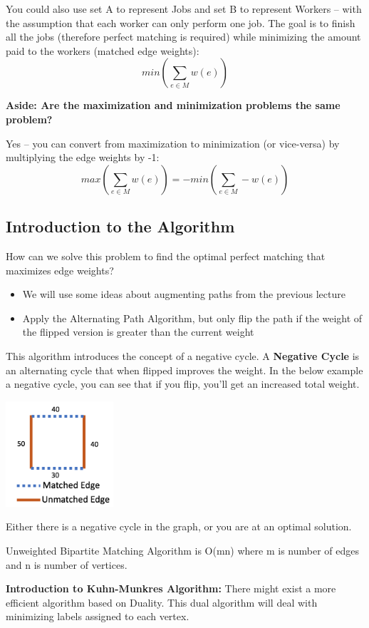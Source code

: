 \documentclass[a4paper]{article}
\begin{document}
You could also use set A to represent Jobs and set B to represent Workers – with the assumption that each worker can only perform one job. The goal is to finish all the jobs (therefore perfect matching is required) while minimizing the amount paid to the workers (matched edge weights):
	\[min(\sum_{e\in M} w(e))\]

\textbf{Aside: Are the maximization and minimization problems the same problem?}

Yes -- you can convert from maximization to minimization (or vice-versa) by multiplying the edge weights by -1:
	\[max(\sum_{e\in M} w(e)) = -min(\sum_{e\in M} -w(e))\]

\subsection{Introduction to the Algorithm}
How can we solve this problem to find the optimal perfect matching that maximizes edge weights?
\begin{itemize}
\item We will use some ideas about augmenting paths from the previous lecture
\item Apply the Alternating Path Algorithm, but only flip the path if the weight of the flipped version is greater than the current weight
\end{itemize}

This algorithm introduces the concept of a negative cycle.
A \textbf{Negative Cycle} is an alternating cycle that when flipped improves the weight.
In the below example a negative cycle, you can see that if you flip, you’ll get an increased total weight.
\begin{center}
\includegraphics[width=4cm]{NegativeCycle.png}
\end{center}
Either there is a negative cycle in the graph, or you are at an optimal solution.


Unweighted Bipartite Matching Algorithm is O(mn) where m is number of edges and n is number of vertices. 

\textbf{Introduction to Kuhn-Munkres Algorithm: }
There might exist a more efficient algorithm based on Duality. This dual algorithm will deal with minimizing labels assigned to each vertex.
\end{document}
